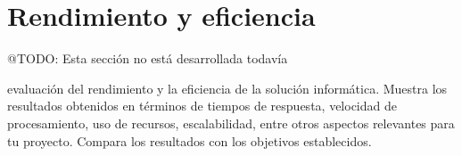 \section{Rendimiento y eficiencia}

\colorbox{color_highlight}{@TODO: Esta sección no está desarrollada todavía}

evaluación del rendimiento y la eficiencia de la solución informática.
Muestra los resultados obtenidos en términos de tiempos de respuesta, velocidad de procesamiento, uso de recursos,
escalabilidad, entre otros aspectos relevantes para tu proyecto.
Compara los resultados con los objetivos establecidos.
